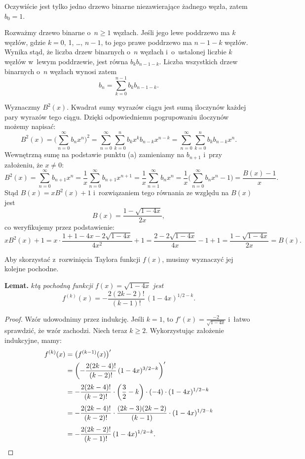 
\subproblem %
Oczywiście jest tylko jedno drzewo binarne niezawierające żadnego węzła, zatem $b_0=1$.

Rozważmy drzewo binarne o~$n\ge1$ węzłach.
Jeśli jego lewe poddrzewo ma $k$ węzłów, gdzie $k=0$, 1, \dots, $n-1$, to jego prawe poddrzewo ma $n-1-k$ węzłów.
Wynika stąd, że liczba drzew binarnych o~$n$ węzłach i~o~ustalonej liczbie $k$ węzłów w~lewym poddrzewie, jest równa $b_kb_{n-1-k}$.
Liczba wszystkich drzew binarnych o~$n$ węzłach wynosi zatem
\[
	b_n = \sum_{k=0}^{n-1}b_kb_{n-1-k}.
\]

\subproblem %
Wyznaczmy $B^2(x)$.
Kwadrat sumy wyrazów ciągu jest sumą iloczynów każdej pary wyrazów tego ciągu.
Dzięki odpowiedniemu pogrupowaniu iloczynów możemy napisać:
\[
	B^2(x) = \biggl(\sum_{n=0}^\infty b_nx^n\biggr)^2 = \sum_{n=0}^\infty\sum_{k=0}^nb_kx^kb_{n-k}x^{n-k} = \sum_{n=0}^\infty\sum_{k=0}^nb_kb_{n-k}x^n.
\]
Wewnętrzną sumę na podstawie punktu (a) zamieniamy na $b_{n+1}$ i~przy założeniu, że $x\ne0$:
\[
	B^2(x) = \sum_{n=0}^\infty b_{n+1}x^n = \frac{1}{x}\sum_{n=0}^\infty b_{n+1}x^{n+1} = \frac{1}{x}\sum_{n=1}^\infty b_nx^n = \frac{1}{x}\biggl(\sum_{n=0}^\infty b_nx^n-1\biggr) = \frac{B(x)-1}{x}.
\]
Stąd $B(x)=xB^2(x)+1$ i~rozwiązaniem tego równania ze względu na $B(x)$ jest
\[
	B(x) = \frac{1-\sqrt{1-4x}}{2x},
\]
co weryfikujemy przez podstawienie:
\[
	xB^2(x)+1 = x\cdot\frac{1+1-4x-2\sqrt{1-4x}}{4x^2}+1 = \frac{2-2\sqrt{1-4x}}{4x}-1+1 = \frac{1-\sqrt{1-4x}}{2x} = B(x).
\]

\subproblem %

\noindent Aby skorzystać z~rozwinięcia Taylora funkcji $f(x)$, musimy wyznaczyć jej kolejne pochodne.

\medskip
\noindent\textsf{\textbf{Lemat.}} \textit{$k$\nbhyphen tą pochodną funkcji\/ $f(x)=\sqrt{1-4x}$ jest
\[
	f^{(k)}(x) = -\frac{2(2k-2)!}{(k-1)!}\,(1-4x)^{1/2-k}.
\]
}
\begin{proof}
Wzór udowodnimy przez indukcję.
Jeśli $k=1$, to $f'(x)=\frac{-2}{\sqrt{1-4x}}$ i~łatwo sprawdzić, że wzór zachodzi.
Niech teraz $k\ge2$.
Wykorzystując założenie indukcyjne, mamy:
\begin{align*}
	f^{(k)}(x) &= \bigl(f^{(k-1)}(x)\bigr)' \\
	&= \biggl(-\frac{2(2k-4)!}{(k-2)!}\,(1-4x)^{3/2-k}\biggr)' \\[1mm]
	&= -\frac{2(2k-4)!}{(k-2)!}\cdot\biggl(\frac{3}{2}-k\biggr)\cdot(-4)\cdot(1-4x)^{1/2-k} \\[1mm]
	&= -\frac{2(2k-4)!}{(k-2)!}\cdot\frac{(2k-3)(2k-2)}{(k-1)}\cdot(1-4x)^{1/2-k} \\[1mm]
	&= -\frac{2(2k-2)!}{(k-1)!}\,(1-4x)^{1/2-k}. \qedhere
\end{align*}
\end{proof}

